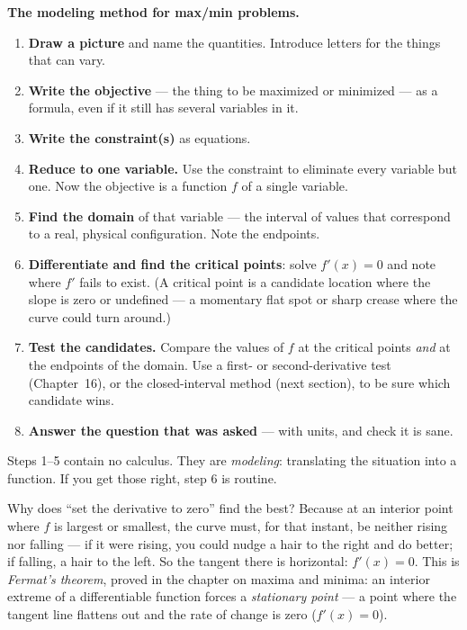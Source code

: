 \begin{focusbox}
\textbf{The modeling method for max/min problems.}
\begin{enumerate}
  \item \textbf{Draw a picture} and name the quantities. Introduce letters for the
    things that can vary.
  \item \textbf{Write the objective} --- the thing to be maximized or minimized ---
    as a formula, even if it still has several variables in it.
  \item \textbf{Write the constraint(s)} as equations.
  \item \textbf{Reduce to one variable.} Use the constraint to eliminate every
    variable but one. Now the objective is a function $f$ of a single variable.
  \item \textbf{Find the domain} of that variable --- the interval of values that
    correspond to a real, physical configuration. Note the endpoints.
  \item \textbf{Differentiate and find the critical points}: solve $f'(x)=0$ and note
    where $f'$ fails to exist. (A critical point is a candidate location where the slope
    is zero or undefined --- a momentary flat spot or sharp crease where the curve could
    turn around.)
  \item \textbf{Test the candidates.} Compare the values of $f$ at the critical
    points \emph{and} at the endpoints of the domain. Use a first- or
    second-derivative test (Chapter~16), or the closed-interval method (next
    section), to be sure which candidate wins.
  \item \textbf{Answer the question that was asked} --- with units, and check it is
    sane.
\end{enumerate}
\end{focusbox}

Steps 1--5 contain no calculus. They are \emph{modeling}: translating the situation
into a function. If you get those right, step 6 is routine.

\begin{whybox}
Why does ``set the derivative to zero'' find the best? Because at an interior point
where $f$ is largest or smallest, the curve must, for that instant, be neither rising
nor falling --- if it were rising, you could nudge a hair to the right and do better;
if falling, a hair to the left. So the tangent there is horizontal: $f'(x)=0$. This
is \emph{Fermat's theorem}, proved in the chapter on maxima and minima: an
interior extreme of a differentiable function forces a \emph{stationary point} --- a
point where the tangent line flattens out and the rate of change is zero ($f'(x)=0$).
\end{whybox}

